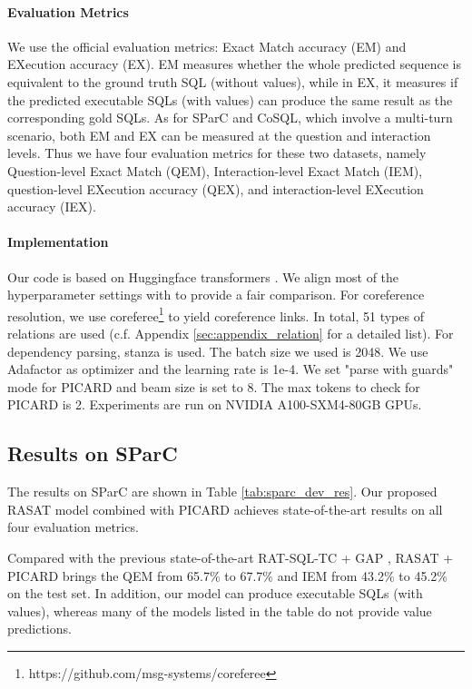 \documentclass[11pt]{article}
\begin{document}
\paragraph{Evaluation Metrics}
We use the official evaluation metrics: Exact Match accuracy (EM) and EXecution accuracy (EX). EM measures whether the whole predicted sequence is equivalent to the ground truth SQL (without values), while in EX, it measures if the predicted executable SQLs (with values) can produce the same result as the corresponding gold SQLs. As for SParC and CoSQL, which involve a multi-turn scenario, both EM and EX can be measured at the question and interaction levels. Thus we have four evaluation metrics for these two datasets, namely Question-level Exact Match (QEM), Interaction-level Exact Match (IEM), question-level EXecution accuracy (QEX), and interaction-level EXecution accuracy (IEX).


\paragraph{Implementation}  Our code is based on Huggingface transformers \citep{wolf-etal-2020-transformers}. 
We align most of the hyperparameter settings with \citet{shaw-etal-2021-compositional} to provide a fair comparison. 
For coreference resolution, we use coreferee\footnote{https://github.com/msg-systems/coreferee} to yield coreference links. In total, 51 types of relations are used (c.f. Appendix \ref{sec:appendix_relation} for a detailed list). For dependency parsing, stanza \citep{qi-etal-2020-stanza} is used. The batch size we used is 2048. We use Adafactor \citep{shazeer2018adafactor} as optimizer and the learning rate is 1e-4. We set "parse with guards" mode for PICARD and beam size is set to 8. The max tokens to check for PICARD is 2. Experiments are run on NVIDIA A100-SXM4-80GB GPUs.


\subsection{Results on SParC}


The results on SParC are shown in Table \ref{tab:sparc_dev_res}. Our proposed RASAT model combined with PICARD achieves state-of-the-art results on all four evaluation metrics.

Compared with the previous state-of-the-art RAT-SQL-TC + GAP \citep{2112.08735}, RASAT + PICARD brings the QEM from 65.7\% to 67.7\% and IEM from 43.2\% to 45.2\% on the test set. In addition, our model can produce executable SQLs (with values), whereas many of the models listed in the table do not provide value predictions. 
\end{document}
